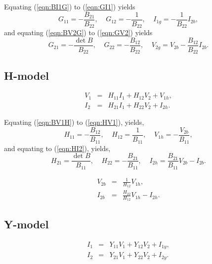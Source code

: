 \documentclass[a4paper, 12pt]{article}
\newcommand{\bigspace}{\;\;\;\;}
\newcommand{\refeqn}[1]{\mbox{(\ref{eqn:#1})}}
\begin{document}
Equating \refeqn{BI1G} to \refeqn{GI1} yields
%
\begin{equation}
 G_{11} = - \frac{B_{21}}{B_{22}}, \bigspace G_{12} = -\frac{1}{B_{22}}, \bigspace I_{1g} = -\frac{1}{B_{22}} I_{2b},
\end{equation}
%
and equating \refeqn{BV2G} to \refeqn{GV2} yields
%
\begin{equation}
  G_{21} = -\frac{\det{B}}{B_{22}}, \bigspace G_{22} = -\frac{B_{12}}{B_{22}}, \bigspace V_{2g} = V_{2b} - \frac{B_{12}}{B_{22}} I_{2b}.
\end{equation}


\subsection{H-model}

\begin{eqnarray}
\label{eqn:HV1}
  V_1 & = & H_{11} I_1 + H_{12} V_2 + V_{1h}, \\
  I_2 & = & H_{21} I_1 + H_{22} V_2 + I_{2h}.
\label{eqn:HI2}
\end{eqnarray}


Equating \refeqn{BV1H} to \refeqn{HV1}, yields,
%
\begin{equation}
  H_{11} = -\frac{B_{12}}{B_{11}}, \bigspace H_{12} = \frac{1}{B_{11}}, \bigspace V_{1h} = -\frac{V_{2b}}{B_{11}},
\end{equation}
%
and equating to \refeqn{HI2}, yields,
%
\begin{equation}
  H_{21} = \frac{\det{B}}{B_{11}}, \bigspace H_{22} = -\frac{B_{21}}{B_{11}}, \bigspace I_{2h} = \frac{B_{21}}{B_{11}} V_{2b} - I_{2b}.
\end{equation}


\begin{eqnarray}
  V_{2b} & = & \frac{1}{H_{12}} V_{1h}, \\
  I_{2b} & = & \frac{H_{22}}{H_{12}} V_{1h} - I_{2h}.
\end{eqnarray}




\subsection{Y-model}

\begin{eqnarray}
\label{eqn:YI1}
  I_1 & = & Y_{11} V_1 + Y_{12} V_2 + I_{1y}, \\
  I_2 & = & Y_{21} V_1 + Y_{22} V_2 + I_{2y}.
\label{eqn:YI2}
\end{eqnarray}
\end{document}

